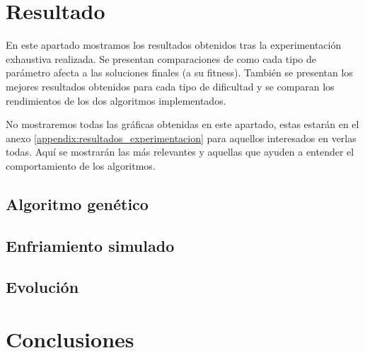 \documentclass[11pt,spanish,listoffigures,listoftables]{tfgetsinf}
\begin{document}
\chapter{Resultado}
En este apartado mostramos los resultados obtenidos tras la experimentación exhaustiva realizada. Se presentan comparaciones de como cada tipo de parámetro afecta a las soluciones finales (a su fitness). También se presentan los mejores resultados obtenidos para cada tipo de dificultad y se comparan los rendimientos de los dos algoritmos implementados.

No mostraremos todas las gráficas obtenidas en este apartado, estas estarán en el anexo \ref{appendix:resultados_experimentacion} para aquellos interesados en verlas todas. Aquí se mostrarán las más relevantes y aquellas que ayuden a entender el comportamiento de los algoritmos.

\section{Algoritmo genético}

\section{Enfriamiento simulado}

\section{Evolución}



\chapter{Conclusiones}

\cleardoublepage
\printbibliography
\end{document}
